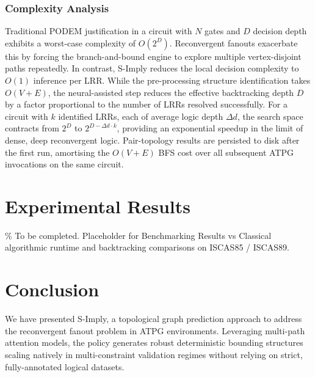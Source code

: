 \documentclass[conference]{IEEEtran}
\begin{document}
\subsubsection{Complexity Analysis}
Traditional PODEM justification in a circuit with $N$ gates and $D$ decision depth exhibits a worst-case complexity of $O(2^D)$. Reconvergent fanouts exacerbate this by forcing the branch-and-bound engine to explore multiple vertex-disjoint paths repeatedly. In contrast, S-Imply reduces the local decision complexity to $O(1)$ inference per LRR.
While the pre-processing structure identification takes $O(V+E)$, the neural-assisted step reduces the effective backtracking depth $D$ by a factor proportional to the number of LRRs resolved successfully. For a circuit with $k$ identified LRRs, each of average logic depth $\Delta d$, the search space contracts from $2^D$ to $2^{D - \Delta d \cdot k}$, providing an exponential speedup in the limit of dense, deep reconvergent logic. Pair-topology results are persisted to disk after the first run, amortising the $O(V+E)$ BFS cost over all subsequent ATPG invocations on the same circuit.

\section{Experimental Results}
\% To be completed. Placeholder for Benchmarking Results vs Classical algorithmic runtime and backtracking comparisons on ISCAS85 / ISCAS89.

\section{Conclusion}
We have presented S-Imply, a topological graph prediction approach to address the reconvergent fanout problem in ATPG environments. Leveraging multi-path attention models, the policy generates robust deterministic bounding structures scaling natively in multi-constraint validation regimes without relying on strict, fully-annotated logical datasets.
\end{document}
